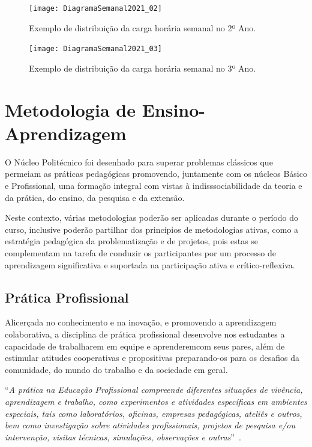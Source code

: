 \documentclass[11pt,fleqn]{book} %
\renewenvironment{quote}
{\small\list{}{\rightmargin=.1cm \leftmargin=2.5cm}%
	\item\relax}
{\endlist}
\begin{document}
\begin{figure}[!htp]
	\centering	
	\texttt{[image: DiagramaSemanal2021\_02]}
	\caption{Exemplo de distribuição da carga horária semanal no 2º Ano.}
	\label{fig:DiagramaSemanal02}
\end{figure}

\begin{figure}[!htp]
	\centering	
	\texttt{[image: DiagramaSemanal2021\_03]}
	\caption{Exemplo de distribuição da carga horária semanal no 3º Ano.}
	\label{fig:DiagramaSemanal03}
\end{figure}

\section{Metodologia de Ensino-Aprendizagem}\label{metodologia}
\indent

O Núcleo Politécnico foi desenhado para superar problemas clássicos que permeiam as práticas pedagógicas promovendo, juntamente com os núcleos Básico e Profissional, uma formação integral com vistas à indisssociabilidade da teoria e da prática, do ensino, da pesquisa e da extensão. 

Neste contexto, várias metodologias poderão ser aplicadas durante o período do curso, inclusive poderão partilhar dos princípios de metodologias ativas, como a estratégia pedagógica da problematização e de projetos, pois estas se complementam na tarefa de conduzir os participantes por um processo de aprendizagem significativa e suportada na participação ativa e crítico-reflexiva. 

\subsection{Prática Profissional}\label{praticasprofissionais}
\indent

Alicerçada no conhecimento e na inovação, e promovendo a aprendizagem colaborativa, a disciplina de prática profissional desenvolve nos estudantes a capacidade de trabalharem em equipe e aprenderemcom seus pares, além de estimular atitudes cooperativas e propositivas preparando-os para os desafios da comunidade, do mundo do trabalho e da sociedade em geral.

\begin{quote}
``\textit{A prática na Educação Profissional compreende diferentes situações de vivência, aprendizagem e trabalho, como experimentos e atividades específicas em ambientes especiais, tais como laboratórios, oficinas, empresas pedagógicas, ateliês e outros, bem como investigação sobre atividades profissionais, projetos de pesquisa e/ou intervenção, visitas técnicas, simulações, observações e outras}''~\cite{Resolucao06De2012}.
\end{quote}
\end{document}
